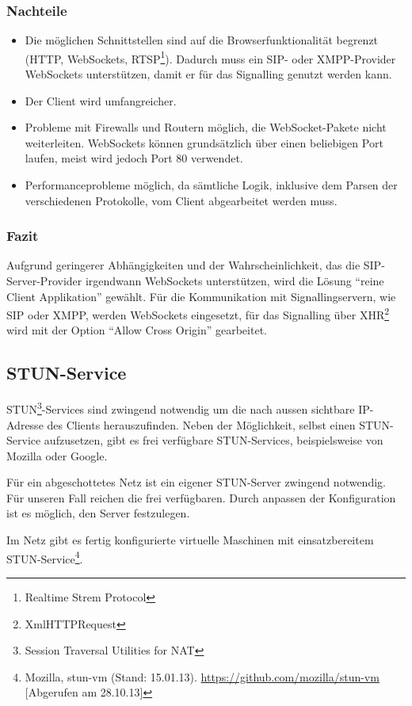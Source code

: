 		\subsubsection{Nachteile}
		\begin{itemize}
			\item Die möglichen Schnittstellen sind auf die Browserfunktionalität
			begrenzt (HTTP, WebSockets, RTSP\footnote{Realtime Strem Protocol}). Dadurch
			muss ein SIP- oder XMPP-Provider WebSockets unterstützen, damit er für das
			Signalling genutzt werden kann.
			\item Der Client wird umfangreicher.
			\item Probleme mit Firewalls und Routern möglich, die WebSocket-Pakete nicht
			weiterleiten. WebSockets können grundsätzlich über einen beliebigen Port laufen, meist wird jedoch Port 80 verwendet.
			\item Performanceprobleme möglich, da sämtliche Logik, inklusive dem Parsen
			der verschiedenen Protokolle, vom Client abgearbeitet werden muss.
		\end{itemize}

		\subsubsection{Fazit}
			Aufgrund geringerer Abhängigkeiten und der Wahrscheinlichkeit, das die
			SIP-Server-Provider irgendwann WebSockets unterstützen, wird die Lösung
			``reine Client Applikation'' gewählt.
			Für die Kommunikation mit Signallingservern, wie SIP oder XMPP, werden
			WebSockets eingesetzt, für das Signalling über XHR\footnote{XmlHTTPRequest}
			wird mit der Option ``Allow Cross Origin'' gearbeitet.

	\subsection{STUN-Service}
		STUN\footnote{Session Traversal Utilities for NAT}-Services sind zwingend
		notwendig um die nach aussen sichtbare IP-Adresse des Clients herauszufinden.
		Neben der Möglichkeit, selbst einen STUN-Service aufzusetzen, gibt es frei
		verfügbare STUN-Services, beispielsweise von Mozilla oder Google.

		Für ein abgeschottetes Netz ist ein eigener STUN-Server zwingend notwendig.
		Für unseren Fall reichen die frei verfügbaren. Durch anpassen der
		Konfiguration ist es möglich, den Server festzulegen.

		Im Netz gibt es fertig konfigurierte virtuelle Maschinen mit einsatzbereitem
		STUN-Service\footnote{Mozilla, stun-vm (Stand: 15.01.13). \hyperlink{https://github.com/mozilla/stun-vm}{https://github.com/mozilla/stun-vm} [Abgerufen am 28.10.13]}.

